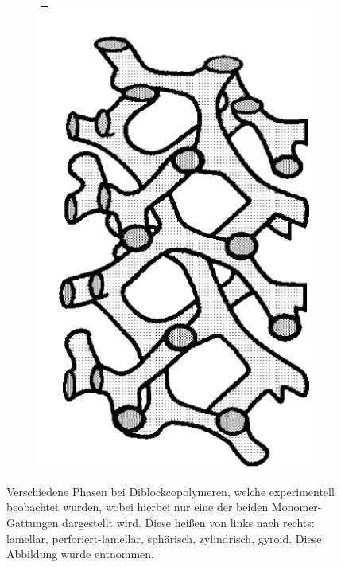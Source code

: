 \documentclass[../main.tex]{subfiles}
\begin{document}
\begin{figure}[tb]
\begin{subfigure}[b]{0.15\textwidth}
        \includegraphics[width=\textwidth]{figures/einleitung/phase5}
    \end{subfigure}
    \caption[Verschiedene Phasen bei Diblockcopolymeren]{%
        Verschiedene Phasen bei Diblockcopolymeren, welche experimentell beobachtet wurden, wobei hierbei nur eine der beiden Monomer-Gattungen dargestellt wird.
        Diese heißen von links nach rechts: lamellar, perforiert-lamellar, sphärisch, zylindrisch, gyroid.
        Diese Abbildung wurde \cite[Figure 1.18]{Matsen:2006ud} entnommen.
    }
    \label{figure:phasen}
\end{figure}
\end{document}

